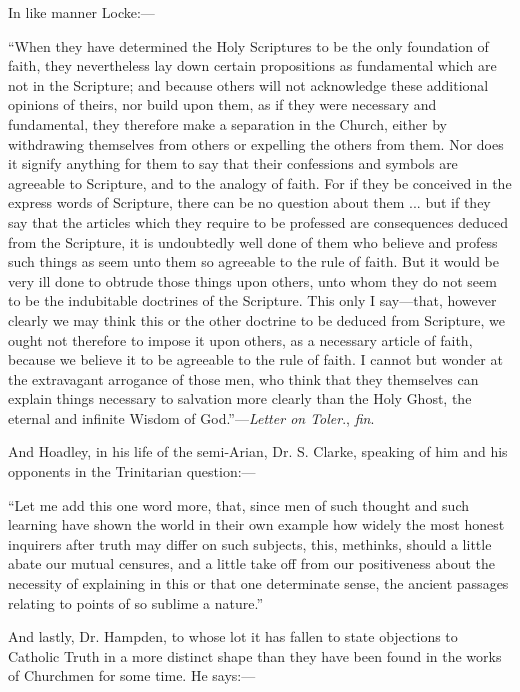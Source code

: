 In like manner Locke:—

``When
they have determined the Holy Scriptures to be the only foundation of
faith, they nevertheless lay down certain propositions as fundamental
which are not in the Scripture; and because others will not
acknowledge these additional opinions of theirs, nor build upon them,
as if they were necessary and fundamental, they therefore make a
separation in the Church, either by withdrawing themselves from others
or expelling the others from them. Nor does it signify anything for
them to say that their confessions and symbols are agreeable to
Scripture, and to the analogy of faith. For if they be conceived in
the express words of Scripture, there can be no question about them
... but if they say that the articles which they require to be
professed are consequences deduced from the Scripture, it is
undoubtedly well done of them who believe and profess such things as
seem unto them so agreeable to the rule of faith. But it would be very
ill done to obtrude those things upon others,
unto whom they do not seem to be the indubitable doctrines of the
Scripture. This only I say—that, however clearly we may think this
or the other doctrine to be deduced from Scripture, we ought not
therefore to impose it upon others, as a necessary article of faith,
because we believe it to be agreeable to the rule of faith. I cannot
but wonder at the extravagant arrogance of those men, who think that
they themselves can explain things necessary to salvation more clearly
than the Holy Ghost, the eternal and infinite Wisdom of God.''—\emph{Letter
on Toler}., \emph{fin}.

And Hoadley, in his life of the semi-Arian, Dr.
S. Clarke, speaking of him and his opponents in the Trinitarian
question:—

``Let
me add this one word more, that, since men of such thought and such
learning have shown the world in their own example how widely the most
honest inquirers after truth may differ on such subjects, this,
methinks, should a little abate our mutual censures, and a little take
off from our positiveness about the necessity of explaining in this or
that one determinate sense, the ancient passages relating to points of
so sublime a nature.''

And lastly, Dr. Hampden, to whose lot it has
fallen to state objections to Catholic Truth in a more distinct shape
than they have been found in the works of Churchmen for some time. He
says:—

